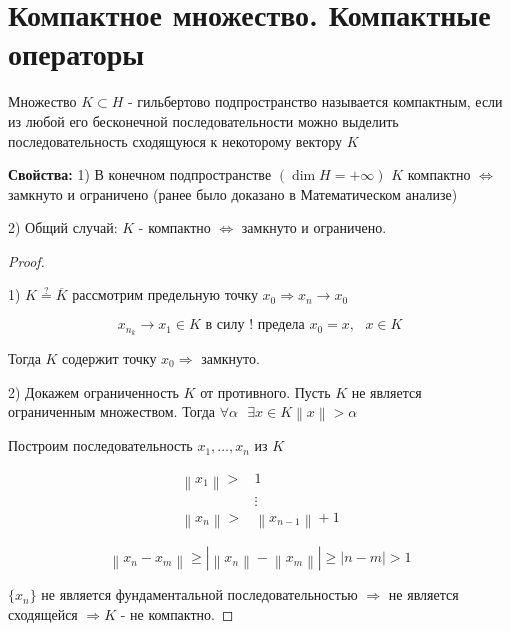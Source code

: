 \documentclass[12pt, a4paper]{report}
\begin{document}
\section{Компактное множество. Компактные операторы}

\begin{definition}
    Множество \( K \subset H \) - гильбертово подпространство  называется компактным, если из любой его бесконечной последовательности можно выделить последовательность сходящуюся к некоторому вектору \( K \)  
\end{definition}

\textbf{Свойства:} 1) В конечном подпространстве \( (\dim  H = + \infty  ) \)   \( K \) компактно \( \Leftrightarrow  \) замкнуто и ограничено (ранее было доказано в Математическом анализе)

2) Общий случай: \( K  \) - компактно \( \Leftrightarrow  \)  замкнуто и ограничено. 

\begin{proof} \(  \) 

    1) \( K \overset{?}{=} \overline{K }   \) рассмотрим предельную точку \( x_0 \Rightarrow x_n \to  x_0 \) 

    \[ x_{n_k } \to  x_1 \in  K \text{ в силу ! предела } x_0 = x ,\text{ }  x \in  K  \] 
 
    Тогда \( K \) содержит точку \( x_0 \Rightarrow  \)  замкнуто. 

    2) Докажем ограниченность \( K \) от противного. Пусть \( K \) не является ограниченным множеством. Тогда \( \forall  \alpha \text{ } \exists  x \in  K \left\lVert x  \right\rVert > \alpha  \) 

    Построим последовательность \( x_1, \ldots, x_n  \) из \( K \) 

    \[ \begin{aligned}
    \left\lVert x_1 \right\rVert >& 1 \\
    &\vdots \\ 
    \left\lVert x_n \right\rVert >& \left\lVert x_{n-1}  \right\rVert+1
    \end{aligned} \] 

    \[ \left\lVert x_n - x_m  \right\rVert  \ge  \left\lvert \left\lVert x_n     \right\rVert - \left\lVert x_m \right\rVert \right\rvert \ge  \left\lvert n - m  \right\rvert >1 \] 

    \( \{x_n\} \) не является фундаментальной последовательностью \( \Rightarrow  \) не является сходящейся \( \Rightarrow K  \) - не компактно.

\end{proof}
\end{document}
